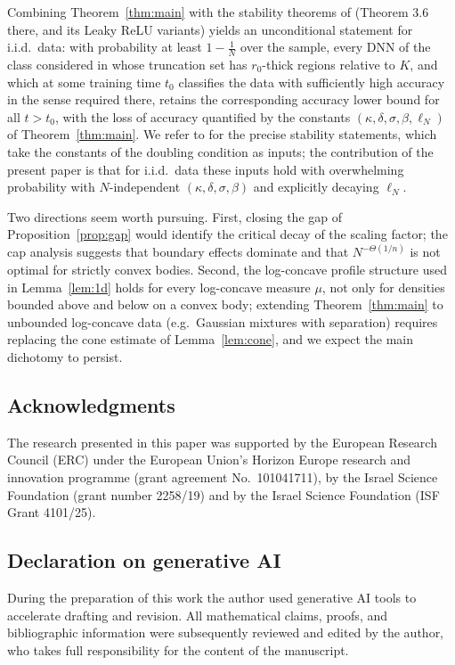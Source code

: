 \documentclass[11pt]{article}
\begin{document}
Combining Theorem~\ref{thm:main} with the stability theorems of \cite{ShmaloUDC}
(Theorem 3.6 there, and its Leaky ReLU variants) yields an unconditional statement
for i.i.d.\ data: with probability at least $1-\frac1N$ over the sample, every DNN
of the class considered in \cite{ShmaloUDC} whose truncation set has
$r_0$-thick regions relative to $K$, and which at some training time $t_0$
classifies the data with sufficiently high accuracy in the sense required there,
retains the corresponding accuracy lower bound for all $t>t_0$, with the loss of
accuracy quantified by the constants
$(\kappa,\delta,\sigma,\beta,\ell_N)$ of Theorem~\ref{thm:main}.  We refer to
\cite[Section 3]{ShmaloUDC} for the precise stability statements, which take the
constants of the doubling condition as inputs; the contribution of the present
paper is that for i.i.d.\ data these inputs hold with overwhelming probability with
$N$-independent $(\kappa,\delta,\sigma,\beta)$ and explicitly decaying $\ell_N$.

Two directions seem worth pursuing.  First, closing the gap of
Proposition~\ref{prop:gap} would identify the critical decay of the scaling factor;
the cap analysis suggests that boundary effects dominate and that
$N^{-\Theta(1/n)}$ is not optimal for strictly convex bodies.  Second, the
log-concave profile structure used in Lemma~\ref{lem:1d} holds for every
log-concave measure $\mu$, not only for densities bounded above and below on a
convex body; extending Theorem~\ref{thm:main} to unbounded log-concave data
(e.g.\ Gaussian mixtures with separation) requires replacing the cone estimate of
Lemma~\ref{lem:cone}, and we expect the main dichotomy to persist.

\subsection*{Acknowledgments}
The research presented in this paper was supported by the European Research Council
(ERC) under the European Union's Horizon Europe research and innovation programme
(grant agreement No.\ 101041711), by the Israel Science Foundation (grant number
2258/19) and by the Israel Science Foundation (ISF Grant 4101/25).

\subsection*{Declaration on generative AI}
During the preparation of this work the author used generative AI tools to
accelerate drafting and revision.  All mathematical claims, proofs, and
bibliographic information were subsequently reviewed and edited by the author, who
takes full responsibility for the content of the manuscript.
\end{document}
